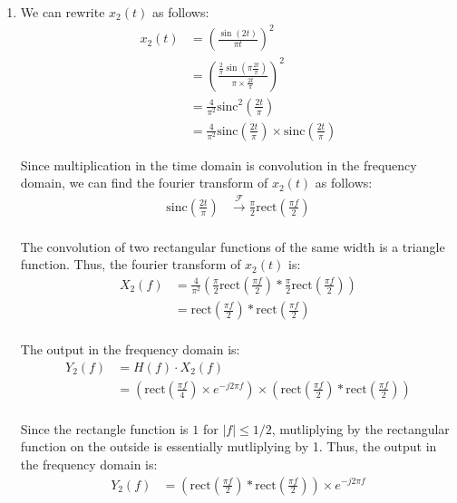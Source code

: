 \documentclass{article}
\begin{document}
\begin{enumerate}[label=2.\arabic*]
    \item We can rewrite $x_2(t)$ as follows:   
    \begin{align*}
        x_2(t) &= \left(\frac{\sin(2t)}{\pi t}\right)^2 \\
        &= \left(\frac{\frac{2}{\pi} \sin\left(\pi \frac{2t}{\pi}\right)}{\pi \times \frac{2t}{\pi}}\right)^2 \\
        &= \frac{4}{\pi^2} \text{sinc}^2\left(\frac{2t}{\pi}\right) \\
        &= \frac{4}{\pi^2} \text{sinc}\left(\frac{2t}{\pi}\right) \times \text{sinc}\left(\frac{2t}{\pi}\right)
    \end{align*}

    Since multiplication in the time domain is convolution in the frequency domain, we can find the fourier transform of $x_2(t)$ as follows:
    \begin{align*}
        \text{sinc}\left(\frac{2t}{\pi}\right) &\xrightarrow{\mathcal{F}} \frac{\pi}{2}\text{rect}\left(\frac{\pi f}{2}\right) \\
    \end{align*}

    The convolution of two rectangular functions of the same width is a triangle function. Thus, the fourier transform of $x_2(t)$ is:
    \begin{align*}
        X_2(f) &= \frac{4}{\pi^2}\left(
            \frac{\pi}{2}\text{rect}\left(\frac{\pi f}{2}\right) \ast \frac{\pi}{2}\text{rect}\left(\frac{\pi f}{2}\right)
        \right) \\
        &= \text{rect}\left(\frac{\pi f}{2}\right) \ast \text{rect}\left(\frac{\pi f}{2}\right) \\
    \end{align*}

    The output in the frequency domain is:
    \begin{align*}
        Y_2(f) &= H(f) \cdot X_2(f) \\
        &= \left( \text{rect}\left(\frac{\pi f}{4}\right) \times e^{-j2\pi f}\right) \times \left(\text{rect}\left(\frac{\pi f}{2}\right) \ast \text{rect}\left(\frac{\pi f}{2}\right)\right) \\
    \end{align*}

    Since the rectangle function is $1$ for $|f| \leq 1/2$, mutliplying by the rectangular function on the outside is essentially mutliplying by 1. Thus, the output in the frequency domain is:
    \begin{align*}
        Y_2(f) &=  \left(\text{rect}\left(\frac{\pi f}{2}\right) \ast \text{rect}\left(\frac{\pi f}{2}\right)\right) \times e^{-j2\pi f} \\
    \end{align*}


\end{enumerate}
\end{document}
